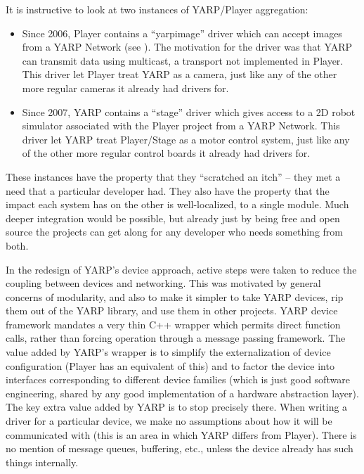 It is instructive to look at two instances of YARP/Player aggregation:

\begin{itemize}

\item
Since 2006, Player contains a ``yarpimage'' driver which can accept
images from a YARP Network (see \cite{}).
The motivation for the driver was that YARP can transmit
data using multicast, a transport not implemented in Player. 
This driver let Player treat YARP as a camera, just like
any of the other more regular cameras it already had drivers 
for.

\item
Since 2007, YARP contains a ``stage'' driver which gives access to 
a 2D robot simulator associated with the Player project 
from a YARP Network.  This driver let YARP treat Player/Stage as
a motor control system, just like any of the other more regular 
control boards it already had drivers for.

\end{itemize}

These instances have the property that they ``scratched an itch'' --
they met a need that a particular developer had.
They also have the property that the impact each system
has on the other is well-localized, to a single module.
Much deeper integration would be possible, but already
just by being free and open source the projects can get along
for any developer who needs something from both.

In the redesign of YARP's device approach, active steps were
taken to reduce the coupling between devices and networking.
%
This was motivated by general concerns of modularity, and also
to make it simpler to take YARP devices, rip them out
of the YARP library, and use them in other projects.
%
%
%
YARP device framework mandates a very thin C++ wrapper which permits direct function
calls, rather than forcing operation through a message passing
framework.  The value added by YARP's wrapper is to simplify the
externalization of device configuration (Player has an equivalent of
this) and to factor the device into interfaces corresponding to
different device families (which is just good software engineering,
shared by any good implementation of a hardware abstraction layer).
%
The key extra value added by YARP is to stop precisely there.
%
When writing a driver for a particular device, we make no assumptions
about how it will be communicated with (this is an area in which YARP
differs from Player).  There is no mention of message queues, 
buffering, etc., unless the device already has such things internally.

